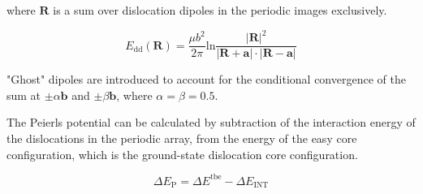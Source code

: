 \documentclass[a4paper]{article}
\begin{document}
where \(\mathbf{R}\) is a sum over dislocation dipoles in the periodic images
exclusively. 

\[ E_{\text{dd}} (\mathbf{R}) = \frac{\mu b^2}{2\pi}
   \text{ln}\frac{|\mathbf{R}|^2}{|\mathbf{R}+\mathbf{a}|\cdot|\mathbf{R}-\mathbf{a}|}
   \]

"Ghost" dipoles are introduced to account for the conditional convergence
of the sum at \(\pm\alpha \mathbf{b}\) and \(\pm \beta\mathbf{b}\), where \(\alpha = \beta = 0.5\).  


The Peierls potential can be calculated by subtraction of the interaction energy of the
dislocations in the periodic array, from the energy of the easy core
configuration, which is the ground-state dislocation core configuration. 

\[ \Delta E_{\text{P}} = \Delta E^{\text{tbe}} - \Delta E_{\text{INT}} \]
\end{document}
